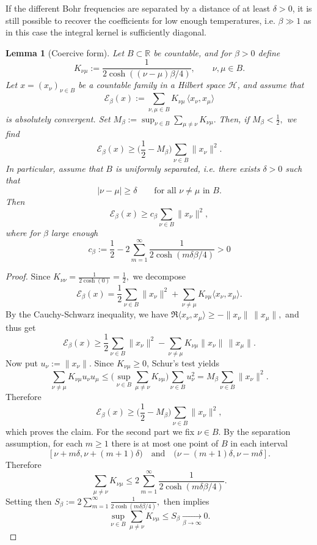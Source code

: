 \documentclass[11pt]{amsart}
\newcommand{\1}{\mathbbm{1}}
\theoremstyle{plain}
\newtheorem{lemma}[theorem]{Lemma}
\theoremstyle{definition}
\theoremstyle{remark}
\numberwithin{equation}{section}
\begin{document}
If the different Bohr frequencies are separated by a distance of at least $\delta>0$, it is still possible to recover the coefficients for low enough temperatures, i.e. $\beta \gg 1$ as in this case the integral kernel is sufficiently diagonal.

\begin{lemma}[Coercive form]
\label{lemm:coercive}
Let \(B\subset \mathbb R\) be countable, and for \(\beta>0\) define
\[
K_{\nu\mu}:=\frac{1}{2\cosh((\nu-\mu)\beta/4)},
\qquad \nu,\mu\in B.
\]
Let \(x=(x_\nu)_{\nu\in B}\) be a countable family in a Hilbert space \(\mathcal H\), and assume that
\[
\mathcal E_\beta(x):=\sum_{\nu,\mu\in B} K_{\nu\mu}\,\langle x_\nu,x_\mu\rangle
\]
is absolutely convergent. Set $M_\beta:=\sup_{\nu\in B}\sum_{\mu\neq \nu} K_{\nu\mu}.$
Then, if $
M_\beta<\frac12,$ we find
\[
\mathcal E_\beta(x)\ge \Big(\frac12-M_\beta\Big)\sum_{\nu\in B}\|x_\nu\|^2.
\]
In particular, assume that \(B\) is uniformly separated, i.e. there exists \(\delta>0\) such that
\[
|\nu-\mu|\ge \delta
\qquad\text{for all }\nu\neq\mu\text{ in }B.
\]
Then
\[
\mathcal E_\beta(x)\ge c_\beta \sum_{\nu\in B}\|x_\nu\|^2,
\]
where for $\beta$ large enough
\[
c_\beta:=\frac12-2\sum_{m=1}^\infty \frac{1}{2\cosh(m\delta\beta/4)}>0
\]
\end{lemma}

\begin{proof}
Since $K_{\nu\nu}=\frac{1}{2\cosh(0)}=\frac12,$
we decompose
\[
\mathcal E_\beta(x)
=
\frac12\sum_{\nu\in B}\|x_\nu\|^2
+
\sum_{\nu\neq\mu}K_{\nu\mu}\langle x_\nu,x_\mu\rangle.
\]
By the Cauchy-Schwarz inequality, we have $\Re\langle x_\nu,x_\mu\rangle\ge -\|x_\nu\|\,\|x_\mu\|,$
and thus get
\[
\mathcal E_\beta(x)
\ge
\frac12\sum_{\nu\in B}\|x_\nu\|^2
-
\sum_{\nu\neq\mu}K_{\nu\mu}\|x_\nu\|\,\|x_\mu\|.
\]
Now put \(u_\nu:=\|x_\nu\|\). Since \(K_{\nu\mu}\ge 0\), Schur's test yields
\[
\sum_{\nu\neq\mu}K_{\nu\mu}u_\nu u_\mu
\le
\Big(\sup_{\nu\in B}\sum_{\mu\neq\nu}K_{\nu\mu}\Big)\sum_{\nu\in B}u_\nu^2
=
M_\beta\sum_{\nu\in B}\|x_\nu\|^2.
\]
Therefore
\[
\mathcal E_\beta(x)
\ge
\Big(\frac12-M_\beta\Big)\sum_{\nu\in B}\|x_\nu\|^2,
\]
which proves the claim.
For the second part we fix \(\nu\in B\). By the separation assumption, for each \(m\ge1\) there is at most one point of \(B\) in each interval
\[
[\nu+m\delta,\nu+(m+1)\delta)
\quad\text{and}\quad
(\nu-(m+1)\delta,\nu-m\delta].
\]
Therefore
\[
\sum_{\mu\neq\nu} K_{\nu\mu}
\le
2\sum_{m=1}^\infty \frac{1}{2\cosh(m\delta\beta/4)}.
\]
Setting then
$S_\beta:=2\sum_{m=1}^\infty \frac{1}{2\cosh(m\delta\beta/4)},$ then implies
\[
\sup_{\nu\in B}\sum_{\mu\neq\nu}K_{\nu\mu}\le S_\beta \xrightarrow[\beta \to \infty]{}0.
\]
\end{proof}
\end{document}
